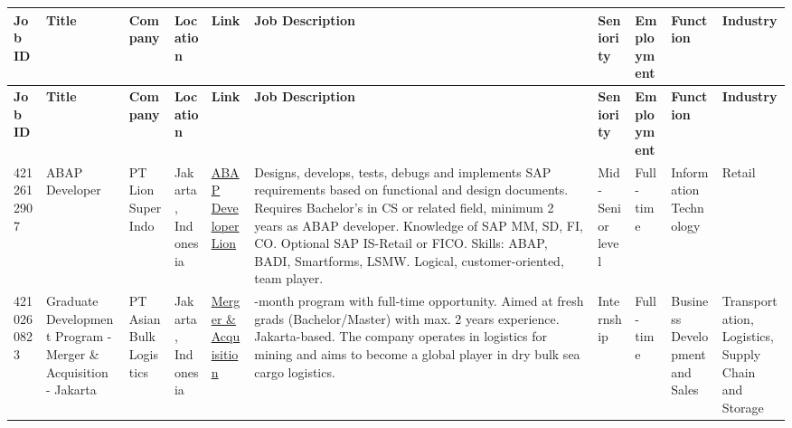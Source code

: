 \begin{landscape}


{\scriptsize
\begin{longtable}{|
    p{1.3cm}|  %
    p{2cm}|  %
    p{2cm}|  %
    p{1.5cm}|  %
    >{\raggedright\arraybackslash}p{2.5cm}|  %
    >{\raggedright\arraybackslash}p{4cm}|  %
    p{2cm}|    %
    p{1.5cm}|  %
    p{2cm}|  %
    p{2cm}|  %
|}
\hline
\textbf{Job ID} & 
\textbf{Title} & 
\textbf{Company} & 
\textbf{Location} & 
\textbf{Link} & 
\textbf{Job Description} & 
\textbf{Seniority} & 
\textbf{Employment} & 
\textbf{Function} & 
\textbf{Industry} \\
\hline
\endfirsthead

\hline
\textbf{Job ID} & 
\textbf{Title} & 
\textbf{Company} & 
\textbf{Location} & 
\textbf{Link} & 
\textbf{Job Description} & 
\textbf{Seniority} & 
\textbf{Employment} & 
\textbf{Function} & 
\textbf{Industry} \\
\hline
\endhead

4212612907 & 
ABAP Developer & 
PT Lion Super Indo & 
Jakarta, Indonesia & 
\href{https://id.linkedin.com/jobs/view/abap-developer-at-pt-lion-super-indo-4212612907}{ABAP Developer Lion} & 
Designs, develops, tests, debugs and implements SAP requirements based on functional and design documents. Requires Bachelor's in CS or related field, minimum 2 years as ABAP developer. Knowledge of SAP MM, SD, FI, CO. Optional SAP IS-Retail or FICO. Skills: ABAP, BADI, Smartforms, LSMW. Logical, customer-oriented, team player. & 
Mid-Senior level & 
Full-time & 
Information Technology & 
Retail \\
\hline

4210260823 & 
Graduate Development Program - Merger \& Acquisition - Jakarta & 
PT Asian Bulk Logistics & 
Jakarta, Indonesia & 
\href{https://id.linkedin.com/jobs/view/graduate-development-program-merger-acquisition-jakarta-at-pt-asian-bulk-logistics-4210260823}{Merger \& Acquisition} & 
12-month program with full-time opportunity. Aimed at fresh grads (Bachelor/Master) with max. 2 years experience. Jakarta-based. The company operates in logistics for mining and aims to become a global player in dry bulk sea cargo logistics. & 
Internship & 
Full-time & 
Business Development and Sales & 
Transportation, Logistics, Supply Chain and Storage \\
\hline

\end{longtable}
}

\end{landscape}



